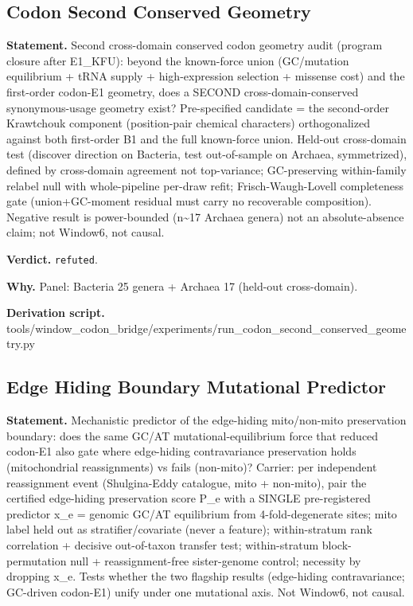 \subsection{Codon Second Conserved Geometry}\label{sec:bridge-codon-second-conserved-geometry}
\textbf{Statement.} Second cross-domain conserved codon geometry audit (program closure after E1\_KFU): beyond the
known-force union (GC/mutation equilibrium + tRNA supply + high-expression selection + missense
cost) and the first-order codon-E1 geometry, does a SECOND cross-domain-conserved synonymous-usage
geometry exist? Pre-specified candidate = the second-order Krawtchouk component (position-pair
chemical characters) orthogonalized against both first-order B1 and the full known-force union.
Held-out cross-domain test (discover direction on Bacteria, test out-of-sample on Archaea,
symmetrized), defined by cross-domain agreement not top-variance; GC-preserving within-family
relabel null with whole-pipeline per-draw refit; Frisch-Waugh-Lovell completeness gate
(union+GC-moment residual must carry no recoverable composition). Negative result is power-bounded
(n\textasciitilde{}17 Archaea genera) not an absolute-absence claim; not Window6, not causal.

\textbf{Verdict.} \texttt{refuted}.

\textbf{Why.} Panel: Bacteria 25 genera + Archaea 17 (held-out cross-domain).

\textbf{Derivation script.} tools/window\_codon\_bridge/experiments/run\_codon\_second\_conserved\_geometry.py

\subsection{Edge Hiding Boundary Mutational Predictor}\label{sec:bridge-edge-hiding-boundary-mutational-predictor}
\textbf{Statement.} Mechanistic predictor of the edge-hiding mito/non-mito preservation boundary: does the same GC/AT
mutational-equilibrium force that reduced codon-E1 also gate where edge-hiding contravariance
preservation holds (mitochondrial reassignments) vs fails (non-mito)? Carrier: per independent
reassignment event (Shulgina-Eddy catalogue, mito + non-mito), pair the certified edge-hiding
preservation score P\_e with a SINGLE pre-registered predictor x\_e = genomic GC/AT equilibrium from
4-fold-degenerate sites; mito label held out as stratifier/covariate (never a feature);
within-stratum rank correlation + decisive out-of-taxon transfer test; within-stratum
block-permutation null + reassignment-free sister-genome control; necessity by dropping x\_e. Tests
whether the two flagship results (edge-hiding contravariance; GC-driven codon-E1) unify under one
mutational axis. Not Window6, not causal.

